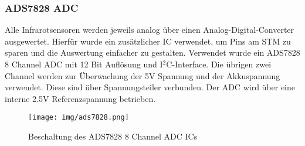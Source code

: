 \documentclass[12pt, a4paper]{report}
\begin{document}
            \subsubsection{ADS7828 ADC}\label{ads7828}
            Alle Infrarotsensoren werden jeweils analog über einen Analog-Digital-Converter ausgewertet. Hierfür wurde ein zusätzlicher IC verwendet, um Pins am STM zu sparen und die Auswertung einfacher zu gestalten. Verwendet wurde ein ADS7828 8 Channel ADC mit 12 Bit Auflösung und I$^2$C-Interface.
            Die übrigen zwei Channel werden zur Überwachung der 5V Spannung und der Akkuspannung verwendet. Diese sind über Spannungsteiler verbunden. Der ADC wird über eine interne 2.5V Referenzspannung betrieben.
            \begin{figure}[H]
               \centering
               \texttt{[image: img/ads7828.png]}
               \caption{Beschaltung des ADS7828 8 Channel ADC ICs}
            \end{figure}
\end{document}
